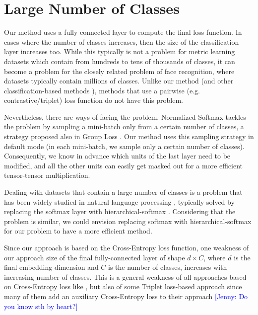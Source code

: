 \documentclass{article}
\newcommand{\jenny}[1]{{\textcolor{blue}{[Jenny: #1]}}}
\begin{document}
\section{Large Number of Classes}
\label{sec:large_num_classes}

Our method uses a fully connected layer to compute the final loss function. In cases where the number of classes increases, then the size of the classification layer increases too. While this typically is not a problem for metric learning datasets which contain from hundreds to tens of thousands of classes, it can become a problem for the closely related problem of face recognition, where datasets typically contain millions of classes. Unlike our method (and other classification-based methods \cite{DBLP:journals/corr/abs-1811-12649, DBLP:conf/aaai/ZhengJSZWH19, DBLP:journals/corr/abs-1909-05235, DBLP:conf/eccv/GrLoss}), methods that use a pairwise (e.g.\, contrastive/triplet) loss function do not have this problem.

Nevertheless, there are ways of facing the problem. Normalized Softmax \cite{DBLP:journals/corr/abs-1811-12649} tackles the problem by sampling a mini-batch only from a certain number of classes, a strategy proposed also in Group Loss \cite{DBLP:conf/eccv/GrLoss}. Our method uses this sampling strategy in default mode (in each mini-batch, we sample only a certain number of classes). Consequently, we know in advance which units of the last layer need to be modified, and all the other units can easily get masked out for a more efficient tensor-tensor multiplication.

Dealing with datasets that contain a large number of classes is a problem that has been widely studied in natural language processing \cite{DBLP:journals/corr/abs-1301-3781}, typically solved by replacing the softmax layer with hierarchical-softmax \cite{DBLP:conf/nips/MnihH08}. Considering that the problem is similar, we could envision replacing softmax with hierarchical-softmax for our problem to have a more efficient method.



\iffalse
Since our approach is based on the Cross-Entropy loss function, one weakness of our approach size of the final fully-connected layer of shape $d \times C$, where $d$ is the final embedding dimension and $C$ is the number of classes, increases with increasing number of classes. This is a general weakness of all approaches based on Cross-Entropy loss like \cite{DBLP:journals/corr/abs-1811-12649}, but also of some Triplet loss-based approach since many of them add an auxiliary Cross-Entropy loss to their approach \jenny{Do you know sth by heart?}
\end{document}
